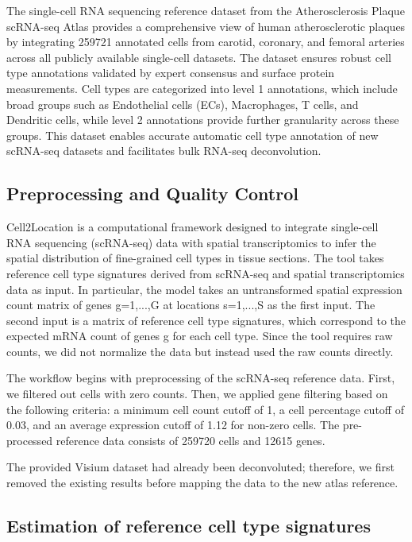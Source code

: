\documentclass[a4paper,12pt]{article}
\begin{document}
The single-cell RNA sequencing reference dataset from the Atherosclerosis Plaque scRNA-seq Atlas provides a comprehensive view of human atherosclerotic plaques by integrating %
259721
 annotated cells from carotid, coronary, and femoral arteries across all publicly available single-cell datasets. The dataset ensures robust cell type annotations validated by expert consensus and surface protein measurements. Cell types are categorized into level 1 annotations, which include broad groups such as Endothelial cells (ECs), Macrophages, T cells, and Dendritic cells, while level 2 annotations provide further granularity across these groups. This dataset enables accurate automatic cell type annotation of new scRNA-seq datasets and facilitates bulk RNA-seq deconvolution.

\subsection{Preprocessing and Quality Control}
Cell2Location is a computational framework designed to integrate single-cell RNA sequencing (scRNA-seq) data with spatial transcriptomics to infer the spatial distribution of fine-grained cell types in tissue sections. The tool takes reference cell type signatures derived from scRNA-seq and spatial transcriptomics data as input. In particular, the model takes an untransformed spatial expression count matrix of genes g={1,...,G} at locations s={1,...,S} as the first input. The second input is a matrix of reference cell type signatures, which correspond to the expected mRNA count of genes g for each cell type. Since the tool requires raw counts, we did not normalize the data but instead used the raw counts directly. 

The workflow begins with preprocessing of the scRNA-seq reference data. First, we filtered out cells with zero counts. Then, we applied gene filtering based on the following criteria: a minimum cell count cutoff of 1, a cell percentage cutoff of 0.03, and an average expression cutoff of 1.12 for non-zero cells. The pre-processed reference data consists of 259720 cells and 12615 genes.

The provided Visium dataset had already been deconvoluted; therefore, we first removed the existing results before mapping the data to the new atlas reference.

\subsection{Estimation of reference cell type signatures}
\end{document}
